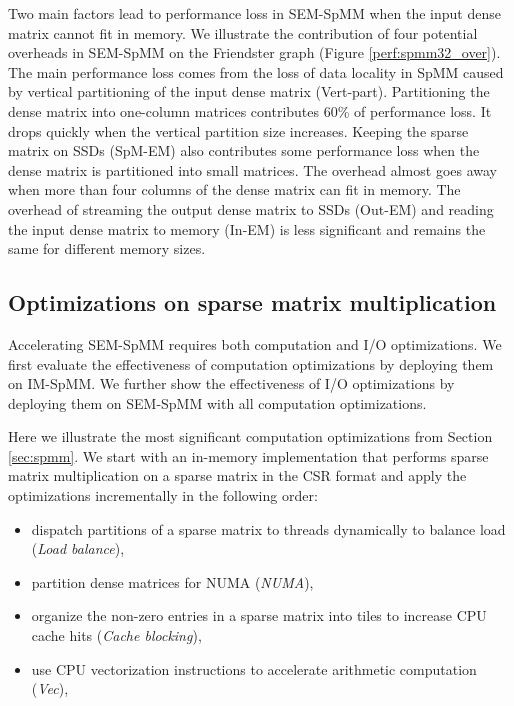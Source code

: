 Two main factors lead to performance loss in SEM-SpMM when the input dense matrix
cannot fit in memory. We illustrate the contribution of four potential overheads
in SEM-SpMM on the Friendster graph (Figure \ref{perf:spmm32_over}). The main
performance loss comes from the loss of data locality in SpMM caused by
vertical partitioning of the input dense matrix (Vert-part). Partitioning
the dense matrix into one-column matrices contributes 60\% of performance loss.
It drops quickly when the vertical
partition size increases. Keeping the sparse matrix on SSDs (SpM-EM)
also contributes some performance loss when the dense matrix is partitioned
into small matrices. The overhead almost goes away when more than four columns
of the dense matrix can fit in memory. The overhead of streaming the output dense
matrix to SSDs (Out-EM) and reading the input dense matrix to memory (In-EM)
is less significant and remains the same for different memory sizes.

\subsection{Optimizations on sparse matrix multiplication}
Accelerating SEM-SpMM requires both computation and I/O optimizations.
We first evaluate the effectiveness of computation optimizations by deploying
them on IM-SpMM. We further show the effectiveness of I/O optimizations by
deploying them on SEM-SpMM with all computation optimizations.

Here we illustrate the most significant computation optimizations from Section
\ref{sec:spmm}. We start with an in-memory implementation that
performs sparse matrix multiplication on a sparse matrix in the CSR format
and apply the optimizations incrementally in the following order:
\begin{itemize} \itemsep1pt \parskip0pt 
	\item dispatch partitions of a sparse matrix to threads dynamically
		to balance load (\textit{Load balance}),
	\item partition dense matrices for NUMA (\textit{NUMA}),
	\item organize the non-zero entries in a sparse matrix into tiles to
		increase CPU cache hits (\textit{Cache blocking}),
	\item use CPU vectorization instructions to accelerate arithmetic
		computation (\textit{Vec}),
\end{itemize}

